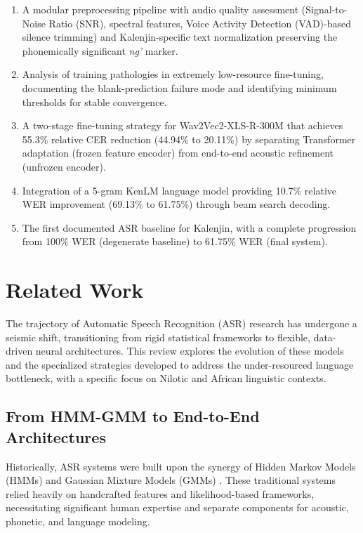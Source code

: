 \documentclass[conference]{IEEEtran}
\begin{document}
\begin{enumerate}
    \item A modular preprocessing pipeline with audio quality assessment (Signal-to-Noise Ratio (SNR), spectral features, Voice Activity Detection (VAD)-based silence trimming) and Kalenjin-specific text normalization preserving the phonemically significant \textit{ng'} marker.
    \item Analysis of training pathologies in extremely low-resource fine-tuning, documenting the blank-prediction failure mode and identifying minimum thresholds for stable convergence.
    \item A two-stage fine-tuning strategy for Wav2Vec2-XLS-R-300M that achieves 55.3\% relative CER reduction (44.94\% to 20.11\%) by separating Transformer adaptation (frozen feature encoder) from end-to-end acoustic refinement (unfrozen encoder).
    \item Integration of a 5-gram KenLM language model \cite{b20} providing 10.7\% relative WER improvement (69.13\% to 61.75\%) through beam search decoding.
    \item The first documented ASR baseline for Kalenjin, with a complete progression from 100\% WER (degenerate baseline) to 61.75\% WER (final system).
\end{enumerate}

\section{Related Work}

The trajectory of Automatic Speech Recognition (ASR) research has undergone a seismic shift, transitioning from rigid statistical frameworks to flexible, data-driven neural architectures. This review explores the evolution of these models and the specialized strategies developed to address the under-resourced language bottleneck, with a specific focus on Nilotic and African linguistic contexts.

\subsection{From HMM-GMM to End-to-End Architectures}

Historically, ASR systems were built upon the synergy of Hidden Markov Models (HMMs) and Gaussian Mixture Models (GMMs) \cite{b10, b22}. These traditional systems relied heavily on handcrafted features and likelihood-based frameworks, necessitating significant human expertise and separate components for acoustic, phonetic, and language modeling.
\end{document}
